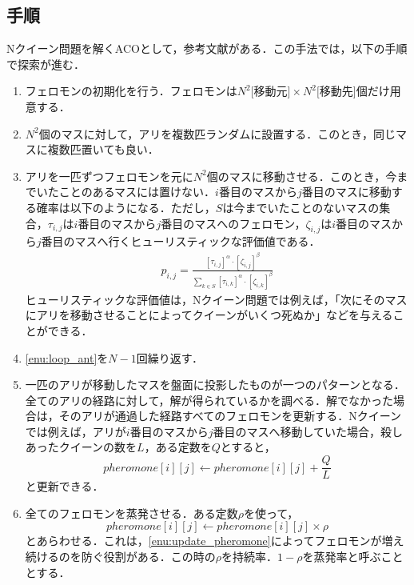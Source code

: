\documentclass{jarticle}
\begin{document}
\subsection{手順}
Nクイーン問題を解くACOとして，参考文献\cite{ref:aco}がある．この手法では，以下の手順で探索が進む．
\begin{enumerate}
	\item フェロモンの初期化を行う．フェロモンは$N^2\text{[移動元]} \times N^2 \text{[移動先]} $個だけ用意する． 
	\item $N^2$個のマスに対して，アリを複数匹ランダムに設置する．このとき，同じマスに複数匹置いても良い．
	\item アリを一匹ずつフェロモンを元に$N^2$個のマスに移動させる．このとき，今までいたことのあるマスには置けない．$i$番目のマスから$j$番目のマスに移動する確率は以下のようになる．ただし，$S$は今までいたことのないマスの集合，$\tau_{i,j}$は$i$番目のマスから$j$番目のマスへのフェロモン，$\zeta_{i,j}$は$i$番目のマスから$j$番目のマスへ行くヒューリスティックな評価値である．
		\begin{eqnarray}
			\label{eq:poss}
			p_{i,j} = \frac{[\tau_{i,j}]^\alpha \cdot [\zeta_{i,j}]^\beta}{\sum_{k \in S} [\tau_{i,k}]^\alpha \cdot [\zeta_{i,k}]^\beta}
		\end{eqnarray}
		ヒューリスティックな評価値は，Nクイーン問題では例えば，「次にそのマスにアリを移動させることによってクイーンがいくつ死ぬか」などを与えることができる．
	\label{enu:loop_ant}
	\item \ref{enu:loop_ant}を$N-1$回繰り返す．
	\item 一匹のアリが移動したマスを盤面に投影したものが一つのパターンとなる．全てのアリの経路に対して，解が得られているかを調べる．解でなかった場合は，そのアリが通過した経路すべてのフェロモンを更新する．Nクイーンでは例えば，アリが$i$番目のマスから$j$番目のマスへ移動していた場合，殺しあったクイーンの数を$L$，ある定数を$Q$とすると，
		\begin{equation}
			\label{eq:phero}
			pheromone[i][j] \leftarrow pheromone[i][j] + \frac{Q}{L}
		\end{equation}
	と更新できる．
	\label{enu:update_pheromone}
	\item 全てのフェロモンを蒸発させる．ある定数$\rho$を使って，
		\begin{equation}
			\label{eq:vapo}
			pheromone[i][j] \leftarrow pheromone[i][j] \times \rho
		\end{equation}
		とあらわせる．これは，\ref{enu:update_pheromone}によってフェロモンが増え続けるのを防ぐ役割がある．この時の$\rho$を持続率．$1-\rho$を蒸発率と呼ぶこととする．
\end{enumerate}
\end{document}
